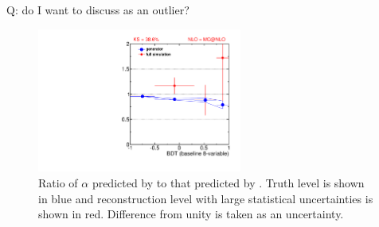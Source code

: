 Q: do I want to discuss \MCATNLO as an outlier?

\begin{figure}[h]
  \centering
  \includegraphics[width=0.6\textwidth]{fig/analysis/ttbar_sys_cjv_mcatnlo03.pdf}
   \caption{Ratio of $\alpha$ predicted by \ALPGEN to that predicted
  by \MCATNLO. Truth level is shown in blue and reconstruction level
  with large statistical uncertainties is shown in red. Difference
  from unity is taken as an uncertainty.}
  \label{chap:analysis:fig:alpha_ratio}
\end{figure}








